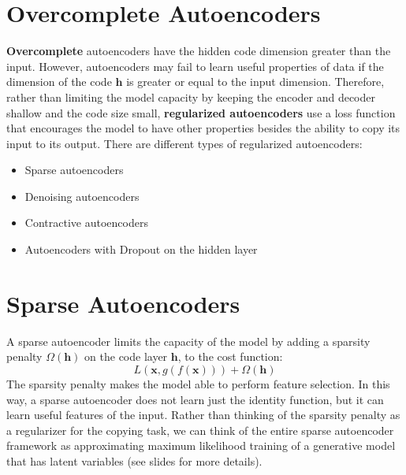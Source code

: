 \section{Overcomplete Autoencoders}
\textbf{Overcomplete} autoencoders have the hidden code dimension greater than the input. However, autoencoders may fail to learn useful properties of data if the dimension of the code $\textbf{h}$ is greater or equal to the input dimension. Therefore, rather than limiting the model capacity by keeping the encoder and decoder shallow and the code size small, \textbf{regularized autoencoders} use a loss function that encourages the model to have other properties besides the ability to copy its input to its output.\newline\newline
There are different types of regularized autoencoders:
\begin{itemize}
    \item Sparse autoencoders
    \item Denoising autoencoders 
    \item Contractive autoencoders
    \item Autoencoders with Dropout on the hidden layer
\end{itemize}

\section{Sparse Autoencoders}
A sparse autoencoder limits the capacity of the model by adding a sparsity penalty $\Omega(\textbf{h})$ on the code layer $\textbf{h}$, to the cost function:
\[L(\textbf{x}, g(f(\textbf{x}))) + \Omega(\textbf{h})\]
The sparsity penalty makes the model able to perform feature selection. In this way, a sparse autoencoder does not learn just the identity function, but it can learn useful features of the input.\newline\newline
Rather than thinking of the sparsity penalty as a regularizer for the copying task, we can think of the entire sparse autoencoder framework as approximating maximum likelihood training of a generative model that has latent variables (see slides for more details).


